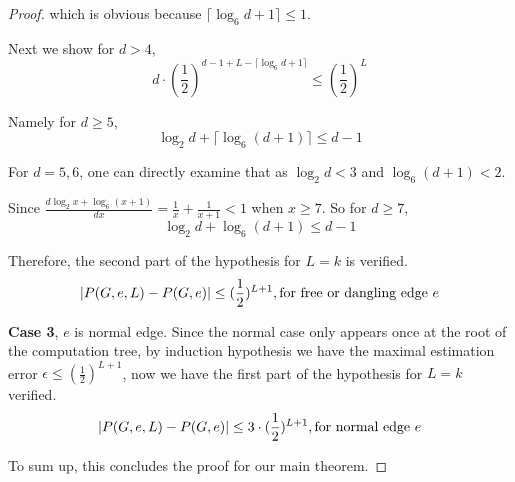 \begin{proof}
		which is obvious because $\lceil\log_6{d+1}\rceil \leq 1$.

		Next we show for $d >4$,
		\[ d\cdot \left( \frac{1}{2} \right)^{d-1 + L - \lceil \log_6{d+1}\rceil}  \leq \left( \frac{1}{2} \right)^L \]

		Namely for $d \geq 5$,
		\[ \log_2 d + \lceil \log_6{(d+1)} \rceil \leq d-1\]

		For $d=5,6$, one can directly examine that as $\log_2 d < 3$ and $\log_6 (d+1) < 2$.

        Since $\frac{d \log_2 x + \log_6 (x+1)}{dx} = \frac{1}{x} + \frac{1}{x+1} < 1$ when $x \geq 7$.
        So for $d \ge 7$,
        \[ \log_2 d + \log_6{(d+1)} \leq d-1\]

		Therefore, the second part of the hypothesis for $L=k$ is verified.
		\[\left\vert P(G,e,L) - P(G,e)\right\vert \leq (\frac{1}{2})^{L+1}, \textrm{for free or dangling edge $e$}\]

		{\bf Case 3}, $e$ is normal edge. Since the normal case only appears once at the root of the computation tree,
		by induction hypothesis we have the maximal estimation error $\epsilon \leq (\frac{1}{2})^{L+1}$,
		now we have the first part of the hypothesis for $L=k$ verified.
		\[\left\vert P(G,e,L) - P(G,e)\right\vert \leq 3\cdot(\frac{1}{2})^{L+1}, \textrm{for normal edge $e$}\]
		
		To sum up, this concludes the proof for our main theorem.
	\end{proof}
